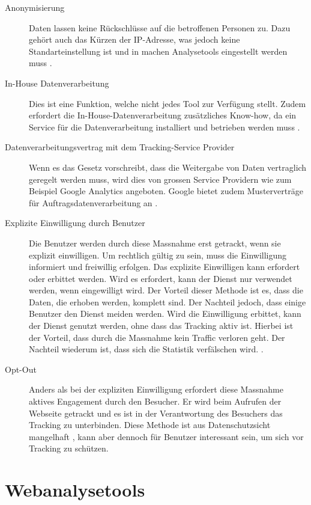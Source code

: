 \begin{description}
  \item[Anonymisierung] Daten lassen keine Rückschlüsse auf die betroffenen Personen zu. Dazu gehört auch das Kürzen der IP-Adresse, was jedoch keine Standarteinstellung ist und in machen Analysetools eingestellt werden muss \parencite[S. 3]{EcommerceUndDatenschutz}.
  \item[In-House Datenverarbeitung] Dies ist eine Funktion, welche nicht jedes Tool zur Verfügung stellt. Zudem erfordert die In-House-Datenverarbeitung zusätzliches Know-how, da ein Service für die Datenverarbeitung installiert und betrieben werden muss \parencite[S. 175]{nakatani2011toolselectionmethod}. 
  \item[Datenverarbeitungsvertrag mit dem Tracking-Service Provider] Wenn es das Gesetz vorschreibt, dass die Weitergabe von Daten vertraglich geregelt werden muss, wird dies von grossen Service Providern wie zum Beispiel Google Analytics angeboten. Google bietet zudem Musterverträge für Auftragsdatenverarbeitung an \parencite[S. 5]{EcommerceUndDatenschutz}. 
  \item[Explizite Einwilligung durch Benutzer] Die Benutzer werden durch diese Massnahme erst getrackt, wenn sie explizit einwilligen. Um rechtlich gültig zu sein, muss die Einwilligung informiert und freiwillig erfolgen. Das explizite Einwilligen kann erfordert oder erbittet werden. Wird es erfordert, kann der Dienst nur verwendet werden, wenn eingewilligt wird. Der Vorteil dieser Methode ist es, dass die Daten, die erhoben werden, komplett sind. Der Nachteil jedoch, dass einige Benutzer den Dienst meiden werden. Wird die Einwilligung erbittet, kann der Dienst genutzt werden, ohne dass das Tracking aktiv ist. Hierbei ist der Vorteil, dass durch die Massnahme kein Traffic verloren geht. Der Nachteil wiederum ist, dass sich die Statistik verfälschen wird. \parencite[S. 2-3]{EcommerceUndDatenschutz}.
  \item[Opt-Out] Anders als bei der expliziten Einwilligung erfordert diese Massnahme aktives Engagement durch den Besucher. Er wird beim Aufrufen der Webseite getrackt und es ist in der Verantwortung des Besuchers das Tracking zu unterbinden. Diese Methode ist aus Datenschutzsicht mangelhaft \parencite[§§ 9 Abs. 4]{DSSGBERN}, kann aber dennoch für Benutzer interessant sein, um sich vor Tracking zu schützen.
\end{description}

\newpage

\section{Webanalysetools}

